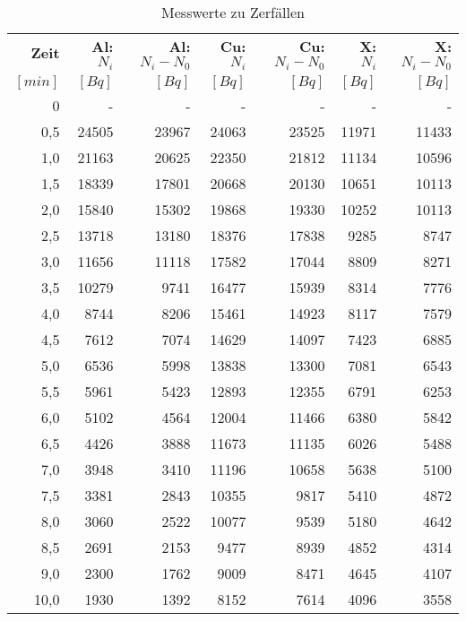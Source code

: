 \documentclass{article}
\begin{document}
\begin{table}[h!]
  	\begin{center}
    	\begin{tabular}{r|r|r|r|r|r|r}
      	\textbf{Zeit} & \textbf{Al: $N_i$} & \textbf{Al: $N_i - N_0$} & \textbf{Cu: $N_i$} & \textbf{Cu: $N_i - N_0$} & \textbf{X: $N_i$} & \textbf{X: $N_i - N_0$} \\
      	$[min]$ & $[Bq]$ & $[Bq]$ & $[Bq]$ & $[Bq]$ & $[Bq]$ & $[Bq]$ \\
      	\hline
      	0 & - & - & - & - & - & -   \\
      	0,5 & 24505 & 23967 & 24063 & 23525 & 11971 & 11433   \\
      	1,0 & 21163 & 20625 & 22350 & 21812 & 11134 & 10596   \\
      	1,5 & 18339 & 17801 & 20668 & 20130 & 10651 & 10113   \\
      	2,0 & 15840 & 15302 & 19868 & 19330 & 10252 & 10113   \\
      	2,5 & 13718 & 13180 & 18376 & 17838 & 9285  & 8747    \\
      	3,0 & 11656 & 11118 & 17582 & 17044 & 8809  & 8271    \\
      	3,5 & 10279 & 9741  & 16477 & 15939 & 8314  & 7776    \\
      	4,0 & 8744  & 8206  & 15461 & 14923 & 8117  & 7579    \\
      	4,5 & 7612  & 7074  & 14629 & 14097 & 7423  & 6885    \\
      	5,0 & 6536  & 5998  & 13838 & 13300 & 7081  & 6543    \\
      	5,5 & 5961  & 5423  & 12893 & 12355 & 6791  & 6253    \\
      	6,0 & 5102  & 4564  & 12004 & 11466 & 6380  & 5842    \\
      	6,5 & 4426  & 3888  & 11673 & 11135 & 6026  & 5488    \\
      	7,0 & 3948  & 3410  & 11196 & 10658 & 5638  & 5100    \\
      	7,5 & 3381  & 2843  & 10355 & 9817  & 5410  & 4872    \\
      	8,0 & 3060  & 2522  & 10077 & 9539  & 5180  & 4642    \\
      	8,5 & 2691  & 2153  & 9477  & 8939  & 4852  & 4314    \\
      	9,0 & 2300  & 1762  & 9009  & 8471  & 4645  & 4107    \\
      	10,0 & 1930 & 1392  & 8152  & 7614   & 4096  & 3558   \\
    	\end{tabular}
    	\caption{Messwerte zu Zerfällen}
    	\label{tab:table2}
   
  \end{center}
\end{table}
\end{document}
